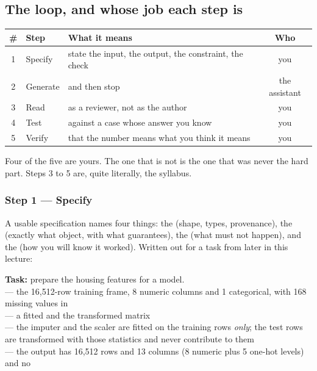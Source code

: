 \documentclass[11pt,a4paper]{article}
\begin{document}
\subsection{The loop, and whose job each step is}

\begin{center}
\small
\begin{tabular}{clp{}c}
\toprule
\textbf{\#} & \textbf{Step} & \textbf{What it means} & \textbf{Who} \\
\midrule
1 & Specify & state the input, the output, the constraint, the check & you \\
2 & Generate & and then stop & the assistant \\
3 & Read & as a reviewer, not as the author & you \\
4 & Test & against a case whose answer you know & you \\
5 & Verify & that the number means what you think it means & you \\
\bottomrule
\end{tabular}
\end{center}

Four of the five are yours. The one that is not is the one that was never the
hard part. Steps 3 to 5 are, quite literally, the syllabus.

\subsubsection{Step 1 --- Specify}

A usable specification names four things: the  (shape, types,
provenance), the  (exactly what object, with what guarantees), the
 (what must not happen), and the  (how you will
know it worked). Written out for a task from later in this lecture:

\begin{keybox}[title={A specification, in full}]
\textbf{Task:} prepare the housing features for a model.\\[2mm]
 --- the 16{,}512-row training frame, 8 numeric columns and 1
categorical, with 168 missing values in \\
 --- a fitted  and the transformed
matrix\\
 --- the imputer and the scaler are fitted on the training
rows \emph{only}; the test rows are transformed with those statistics and never
contribute to them\\
 --- the output has 16{,}512 rows and 13 columns (8 numeric plus 5
one-hot levels) and no 
\end{keybox}
\end{document}
